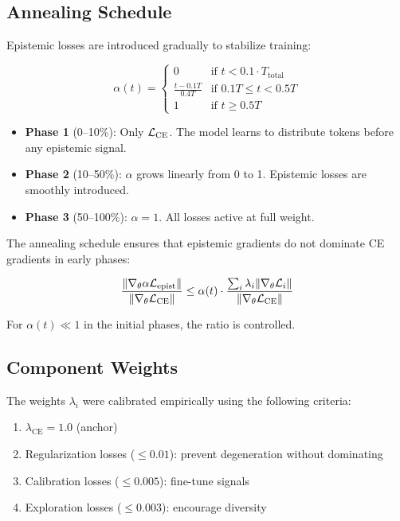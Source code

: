 \subsection{Annealing Schedule}
\label{sec:annealing}

Epistemic losses are introduced gradually to stabilize training:

\begin{equation}
    \alpha(t) = \begin{cases}
        0 & \text{if } t < 0.1 \cdot T_{\text{total}} \\
        \frac{t - 0.1T}{0.4T} & \text{if } 0.1T \leq t < 0.5T \\
        1 & \text{if } t \geq 0.5T
    \end{cases}
    \label{eq:annealing}
\end{equation}

\begin{itemize}
    \item \textbf{Phase 1} (0--10\%): Only $\mathcal{L}_{\text{CE}}$. The model
    learns to distribute tokens before any epistemic signal.

    \item \textbf{Phase 2} (10--50\%): $\alpha$ grows linearly from 0 to 1.
    Epistemic losses are smoothly introduced.

    \item \textbf{Phase 3} (50--100\%): $\alpha = 1$. All losses active
    at full weight.
\end{itemize}

\begin{theorem}
The annealing schedule ensures that epistemic gradients do not dominate
CE gradients in early phases:

\begin{equation}
    \frac{\|\nabla_\theta \alpha \mathcal{L}_{\text{epist}}\|}{\|\nabla_\theta \mathcal{L}_{\text{CE}}\|} \leq \alpha(t) \cdot \frac{\sum_i \lambda_i \|\nabla_\theta \mathcal{L}_i\|}{\|\nabla_\theta \mathcal{L}_{\text{CE}}\|}
\end{equation}

For $\alpha(t) \ll 1$ in the initial phases, the ratio is controlled.
\end{theorem}

\subsection{Component Weights}

The weights $\lambda_i$ were calibrated empirically using the following
criteria:

\begin{enumerate}
    \item $\lambda_{\text{CE}} = 1.0$ (anchor)
    \item Regularization losses ($\leq 0.01$): prevent degeneration
    without dominating
    \item Calibration losses ($\leq 0.005$): fine-tune signals
    \item Exploration losses ($\leq 0.003$): encourage diversity
\end{enumerate}
